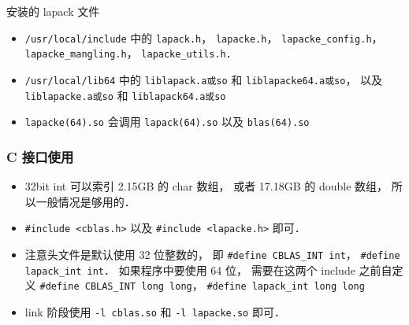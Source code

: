安装的 lapack 文件
\begin{itemize}
\item \verb|/usr/local/include| 中的 \verb|lapack.h|， \verb|lapacke.h|， \verb|lapacke_config.h|， \verb|lapacke_mangling.h|， \verb|lapacke_utils.h|．
\item \verb|/usr/local/lib64| 中的 \verb|liblapack.a或so| 和 \verb|liblapacke64.a或so|， 以及 \verb|liblapacke.a或so| 和 \verb|liblapack64.a或so|
\item \verb|lapacke(64).so| 会调用 \verb|lapack(64).so| 以及 \verb|blas(64).so|
\end{itemize}

\subsubsection{C 接口使用}
\begin{itemize}
\item 32bit int 可以索引 2.15GB 的 char 数组， 或者 17.18GB 的 double 数组， 所以一般情况是够用的．
\item \verb|#include <cblas.h>| 以及 \verb|#include <lapacke.h>| 即可．
\item 注意头文件是默认使用 32 位整数的， 即 \verb|#define CBLAS_INT int|， \verb|#define lapack_int int|． 如果程序中要使用 64 位， 需要在这两个 include 之前自定义 \verb|#define CBLAS_INT long long|， \verb|#define lapack_int long long|
\item link 阶段使用 \verb|-l cblas.so| 和 \verb|-l lapacke.so| 即可．
\end{itemize}
